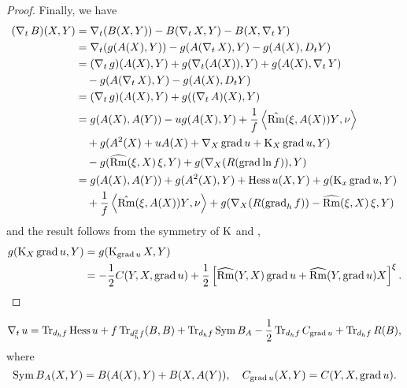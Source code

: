 \documentclass{amsart}
\begin{document}
\begin{proof}
Finally, we have
\[
\begin{split}
(\D_t B) (X, Y) &= \D_t (B(X, Y)) - B(\D_t X, Y) - B(X, \D_t Y) \\
&= \D_t (g(A(X), Y)) - g(A(\D_tX), Y) - g(A(X), D_t Y) \\
&= (\D_t g)(A(X), Y) + g(\D_t(A(X)), Y) + g(A(X), \D_t Y) \\
&\quad - g(A(\D_tX), Y) - g(A(X), D_t Y) \\
&= (\D_t g)(A(X), Y) + g((\D_t A)(X), Y) \\
&= g(A(X), A(Y)) - u g(A(X), Y) + \frac{1}{f} \ip{\hat{\Rm} (\vel, A(X))Y}{\nor} \\
&\quad + g(A^2(X) + u A(X) + \nabla_X \grad u + \diff_X \grad u, Y) \\
&\quad - g(\widehat{\Rm}(\vel, X)\vel, Y) + g(\D_X (R(\grad \ln f)), Y) \\
&= g(A(X), A(Y)) + g(A^2(X), Y) + \hess u (X, Y) + g(\diff_x \grad u, Y) \\
&\quad +\frac{1}{f} \ip{\hat{\Rm} (\vel, A(X))Y}{\nor} + g(\D_X (R(\grad_h f)) - \widehat{\Rm}(\vel, X)\vel, Y) \\
\end{split}
\]
and the result follows from the symmetry of $\diff$ and ,
\[
\begin{split}
g(\diff_X \grad u, Y) &= g(\diff_{\grad u} X, Y) \\
&= -\frac{1}{2} C(Y, X, \grad u) + \frac{1}{2} \left[\widehat{\Rm} (Y, X)\grad u +  \widehat{\Rm} (Y, \grad u) X\right]^{\vel}.
\end{split}
\]
\end{proof}

\begin{lemma}
\label{lem:dtu}
\[
\D_t u = \Tr_{d_hf} \hess u + f\Tr_{d_h^2 f} (B, B) + \Tr_{d_h f} \sym B_A - \frac{1}{2} \Tr_{d_hf} C_{\grad u} + \Tr_{d_h f} R(B),
\]
where
\[
\sym B_A (X, Y) = B(A(X), Y) + B(X, A(Y)), \quad C_{\grad u} (X, Y) = C(Y, X, \grad u).
\]
\end{lemma}
\end{document}
